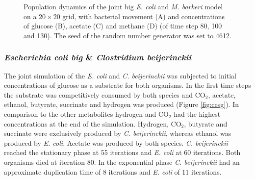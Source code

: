 \begin{figure}[h!]
{  }
  \caption{Population dynamics of the joint big \emph{E. coli} and \emph{M. barkeri} model on a $20\times20$ grid, with bacterial movement (A) and concentrations of glucose (B), acetate (C) and methane (D) (of time step 80, 100 and 130). The seed of the random number generator was set to 4612.}
  \label{fig:begrid}
\end{figure}

\subsubsection{\textit{Escherichia coli big} \& \textit{Clostridium beijerinckii}}
The joint simulation of the \textit{E. coli} and \textit{C. beijerinckii} was subjected to initial concentrations of glucose as a substrate for both organisms. In the first time steps the substrate was competitively consumed by both species and CO$_2$, acetate, ethanol, butyrate, succinate and hydrogen was produced (Figure \hyperref[fig:cesg]{\ref{fig:cesg}}). In comparison to the other metabolites hydrogen and CO$_2$ had the highest concentrations at the end of the simulation.
Hydrogen, CO$_2$, butyrate and succinate were exclusively produced by \textit{C. beijerinckii}, whereas ethanol was produced by \textit{E. coli}. 
Acetate was produced by both species. \textit{C. beijerinckii} reached the stationary phase at 55 iterations and \textit{E. coli} at 60 iterations. Both organisms died at iteration 80. In the exponential phase \textit{C. beijerinckii} had an approximate duplication time of 8 iterations and \textit{E. coli} of 11 iterations.

